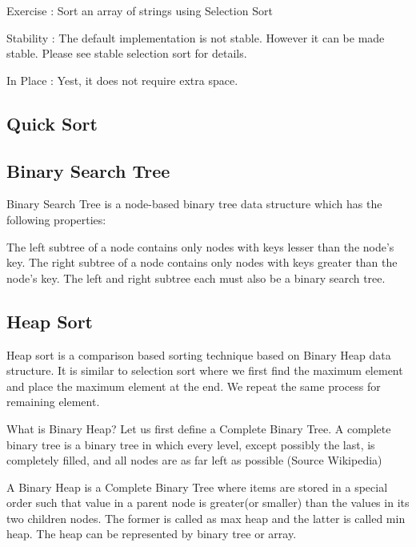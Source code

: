 \documentclass{article}
\begin{document}
Exercise : 
Sort an array of strings using Selection Sort

Stability : The default implementation is not stable. However it can be made stable. Please see stable selection sort for details.

In Place : Yest, it does not require extra space.







\subsection{Quick Sort}








\subsection{Binary Search Tree}

Binary Search Tree is a node-based binary tree data structure which has the following properties:

The left subtree of a node contains only nodes with keys lesser than the node’s key.
The right subtree of a node contains only nodes with keys greater than the node’s key.
The left and right subtree each must also be a binary search tree.








\subsection{Heap Sort}

Heap sort is a comparison based sorting technique based on Binary Heap data structure. It is similar to selection sort where we first find the maximum element and place the maximum element at the end. We repeat the same process for remaining element.

What is Binary Heap?
Let us first define a Complete Binary Tree. A complete binary tree is a binary tree in which every level, except possibly the last, is completely filled, and all nodes are as far left as possible (Source Wikipedia)

A Binary Heap is a Complete Binary Tree where items are stored in a special order such that value in a parent node is greater(or smaller) than the values in its two children nodes. The former is called as max heap and the latter is called min heap. The heap can be represented by binary tree or array.
\end{document}
